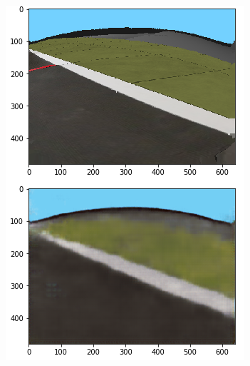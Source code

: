 \documentclass{article}
\begin{document}
\begin{figure}[!ht]
\begin{subfigure}[b]{.24\textwidth}
        \includegraphics[width=\textwidth]{vae2.png}
    \end{subfigure}
    \begin{subfigure}[b]{.24\textwidth}

\end{subfigure}
\end{figure}
\end{document}
